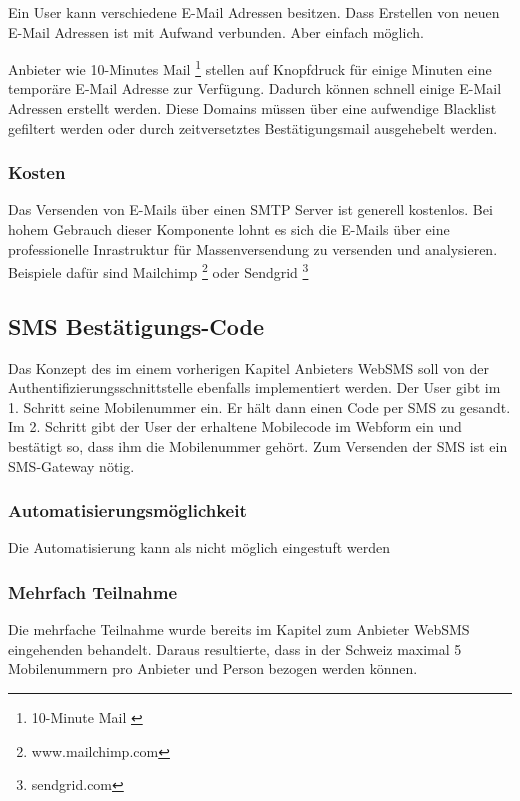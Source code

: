 Ein User kann verschiedene E-Mail Adressen besitzen. Dass Erstellen von
neuen E-Mail Adressen ist mit Aufwand verbunden. Aber einfach möglich.

Anbieter wie 10-Minutes Mail \footnote{10-Minute Mail
  \autocite{10minutemail}} stellen auf Knopfdruck für einige Minuten
eine temporäre E-Mail Adresse zur Verfügung. Dadurch können schnell
einige E-Mail Adressen erstellt werden. Diese Domains müssen über eine
aufwendige Blacklist gefiltert werden oder durch zeitversetztes
Bestätigungsmail ausgehebelt werden.

\subsubsection{Kosten}\label{kosten-3}

Das Versenden von E-Mails über einen SMTP Server ist generell kostenlos.
Bei hohem Gebrauch dieser Komponente lohnt es sich die E-Mails über eine
professionelle Inrastruktur für Massenversendung zu versenden und
analysieren. Beispiele dafür sind Mailchimp \footnote{www.mailchimp.com}
oder Sendgrid \footnote{sendgrid.com}

\subsection{SMS Bestätigungs-Code}\label{sms-bestuxe4tigungs-code}

Das Konzept des im einem vorherigen Kapitel Anbieters WebSMS soll von
der Authentifizierungsschnittstelle ebenfalls implementiert werden. Der
User gibt im 1. Schritt seine Mobilenummer ein. Er hält dann einen Code
per SMS zu gesandt. Im 2. Schritt gibt der User der erhaltene Mobilecode
im Webform ein und bestätigt so, dass ihm die Mobilenummer gehört. Zum
Versenden der SMS ist ein SMS-Gateway nötig.

\subsubsection{Automatisierungsmöglichkeit}\label{automatisierungsmuxf6glichkeit-3}

Die Automatisierung kann als nicht möglich eingestuft werden

\subsubsection{Mehrfach Teilnahme}\label{mehrfach-teilnahme-3}

Die mehrfache Teilnahme wurde bereits im Kapitel zum Anbieter WebSMS
eingehenden behandelt. Daraus resultierte, dass in der Schweiz maximal 5
Mobilenummern pro Anbieter und Person bezogen werden können.

